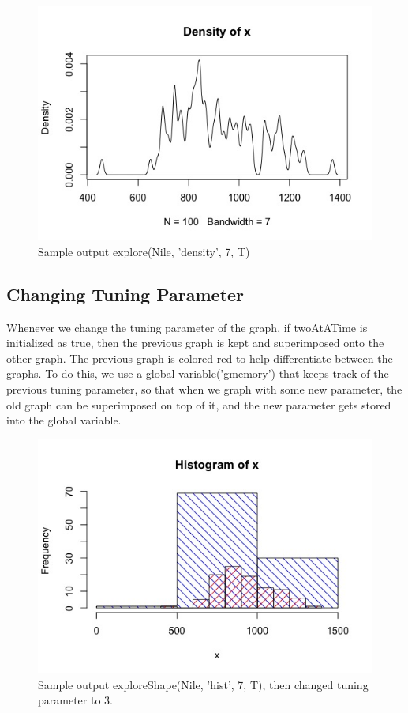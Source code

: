 \documentclass{article}
\begin{document}
\begin{figure}[H]
\centering
\includegraphics[scale=0.5]{Nile, 7 Tuning param.jpeg}
\caption{Sample output explore(Nile, 'density', 7, T)}
\label{fig:Nile density graph 7}
\end{figure}


\subsection{Changing Tuning Parameter}
Whenever we change the tuning parameter of the graph, if twoAtATime is initialized as true, then the previous graph is kept and superimposed onto the other graph. The previous graph is colored red to help differentiate between the graphs. To do this, we use a global variable('gmemory') that keeps track of the previous tuning parameter, so that when we graph with some new parameter, the old graph can be superimposed on top of it, and the new parameter gets stored into the global variable.

\begin{figure}[H]
\centering
\includegraphics[scale=0.5]{Nile, 3 superimposed on 7 hist.jpeg}
\caption{Sample output exploreShape(Nile, 'hist', 7, T), then changed tuning parameter to 3.}
\label{fig:Nile histogram 3 on 7}
\end{figure}
\end{document}
